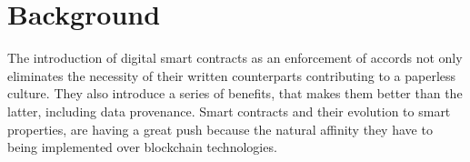 \section{Background}
\label{sec:background}

The introduction of digital smart contracts as an enforcement of accords not only eliminates the necessity of their written counterparts contributing to a paperless culture. They also introduce a series of benefits, that makes them better than the latter, including data provenance. Smart contracts and their evolution to smart properties, are having a great push because the natural affinity they have to being implemented over blockchain technologies.


